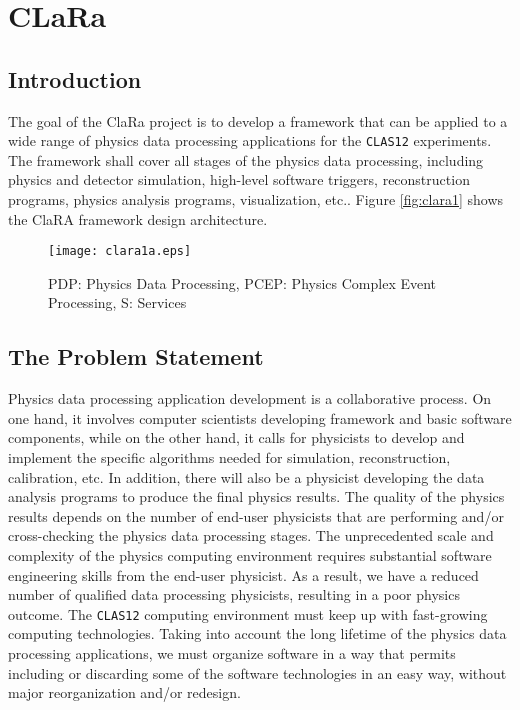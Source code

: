 \section{CLaRa}

\subsection{Introduction}

The goal of the ClaRa project is to develop a framework that can be applied 
to a wide range of physics data processing applications for the {\tt CLAS12}
experiments. The framework shall cover all stages of the physics data 
processing, including physics and detector simulation, high-level software 
triggers, reconstruction programs, physics analysis programs, visualization, 
etc..  
Figure \ref{fig:clara1} shows the ClaRA framework design architecture.

\begin{figure}[htbp]
\centering
\texttt{[image: clara1a.eps]} 
\caption{\small{PDP: Physics Data Processing, PCEP: Physics Complex Event Processing, S: Services}}
\label{fig:clara1a}
\end{figure}

\subsection{The Problem Statement}

Physics data processing application development is a collaborative process. 
On one hand, it involves computer scientists developing framework and basic 
software components, while on the other hand, it calls for physicists to 
develop and implement the specific algorithms needed for simulation, 
reconstruction, calibration, etc.  In addition, there will also be a 
physicist developing the data analysis programs to produce the final physics 
results.  The quality of the physics results depends on the number of 
end-user physicists that are performing and/or cross-checking the physics 
data processing stages. The unprecedented scale and complexity of the physics 
computing environment requires substantial software engineering skills from 
the end-user physicist.  As a result, we have a reduced number of qualified 
data processing physicists, resulting in a poor physics outcome. 
The {\tt CLAS12} computing environment must keep up with fast-growing 
computing technologies.  Taking into account the long lifetime of the physics 
data processing applications, we must organize software in a way that permits 
including or discarding some of the software technologies in an easy way, 
without major reorganization and/or redesign.

